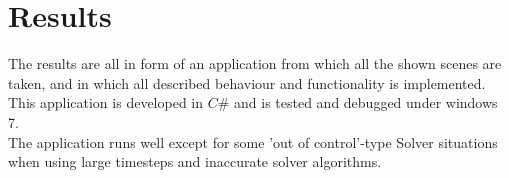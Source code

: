 \chapter{Results}
The results are all in form of an application from which all the shown scenes are taken, and in which all described behaviour and functionality is implemented. This application is developed in $C\#$ and is tested and debugged under windows 7. \\
The application runs well except for some 'out of control'-type Solver situations when using large timesteps and inaccurate solver algorithms. 